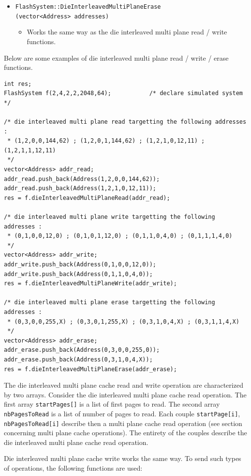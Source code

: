 \begin{itemize}
  \item \verb+FlashSystem::DieInterleavedMultiPlaneErase+\\\verb+(vector<Address> addresses)+
  \begin{itemize}
    \item Works the same way as the die interleaved multi plane read / write functions.
  \end{itemize}
\end{itemize}

Below are some examples of die interleaved multi plane read / write / erase functions.

\begin{lstlisting}
int res;
FlashSystem f(2,4,2,2,2048,64);           /* declare simulated system */

/* die interleaved multi plane read targetting the following addresses :
 * (1,2,0,0,144,62) ; (1,2,0,1,144,62) ; (1,2,1,0,12,11) ; (1,2,1,1,12,11)
 */
vector<Address> addr_read;
addr_read.push_back(Address(1,2,0,0,144,62));
addr_read.push_back(Address(1,2,1,0,12,11));
res = f.dieInterleavedMultiPlaneRead(addr_read);

/* die interleaved multi plane write targetting the following addresses :
 * (0,1,0,0,12,0) ; (0,1,0,1,12,0) ; (0,1,1,0,4,0) ; (0,1,1,1,4,0)
 */
vector<Address> addr_write;
addr_write.push_back(Address(0,1,0,0,12,0));
addr_write.push_back(Address(0,1,1,0,4,0));
res = f.dieInterleavedMultiPlaneWrite(addr_write);

/* die interleaved multi plane erase targetting the following addresses :
 * (0,3,0,0,255,X) ; (0,3,0,1,255,X) ; (0,3,1,0,4,X) ; (0,3,1,1,4,X)
 */
vector<Address> addr_erase;
addr_erase.push_back(Address(0,3,0,0,255,0));
addr_erase.push_back(Address(0,3,1,0,4,X));
res = f.dieInterleavedMultiPlaneErase(addr_erase);
\end{lstlisting}

The die interleaved multi plane cache read and write operation are characterized by two arrays. Consider the die interleaved multi plane cache read operation. The first array \verb+startPages[]+ is a list of first pages to read. The second array \verb+nbPagesToRead+ is a list of number of pages to read. Each couple \verb+startPage[i]+, \verb+nbPagesToRead[i]+ describe then a multi plane cache read operation (see section concerning multi plane cache operations). The entirety of the couples describe the die interleaved multi plane cache read operation.

Die interleaved multi plane cache write works the same way. To send such types of operations, the following functions are used:

